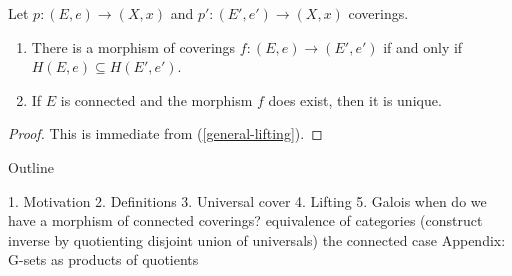 \begin{lemma}
  Let $p : (E,e) \to (X,x)$ and $p' : (E',e') \to (X,x)$
  coverings.
  \begin{enumerate}
  \item There is a morphism of coverings $f : (E,e) \to (E',e')$
    if and only if $H(E,e) \subseteq H(E',e')$.
  \item If $E$ is connected and the morphism $f$ does exist, then it
    is unique.
  \end{enumerate}
\end{lemma}

\begin{proof}
  This is immediate from (\ref{general-lifting}).
\end{proof}










Outline

1. Motivation
2. Definitions
3. Universal cover
4. Lifting
5. Galois
   when do we have a morphism of connected coverings?
   equivalence of categories (construct inverse by quotienting
   disjoint union of universals)
   the connected case
Appendix: G-sets as products of quotients

